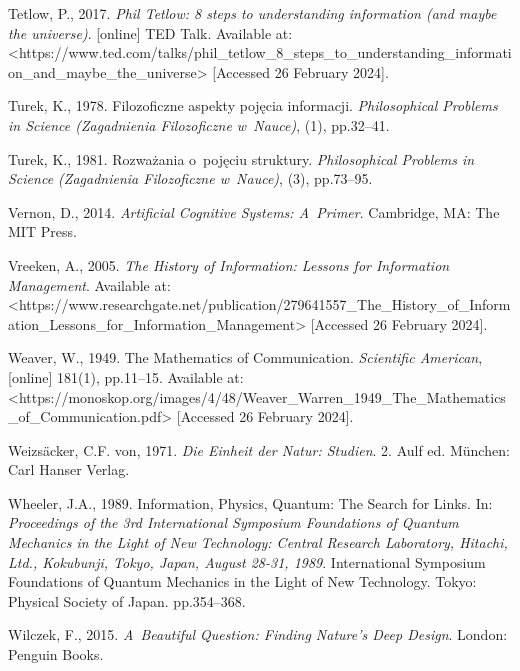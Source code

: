 Tetlow, P., 2017. \textit{Phil Tetlow: 8 steps to understanding information (and maybe the universe)}. [online] TED Talk. Available at: {\textless}https://www.ted.com/talks/phil\_tetlow\_8\_steps\_to\_understanding\_information\_and\_maybe\_the\_universe{\textgreater} [Accessed 26 February 2024].



Turek, K., 1978. Filozoficzne aspekty pojęcia informacji. \textit{Philosophical Problems in Science (Zagadnienia Filozoficzne w~Nauce)}, (1), pp.32–41.



Turek, K., 1981. Rozważania o~pojęciu struktury. \textit{Philosophical Problems in Science (Zagadnienia Filozoficzne w~Nauce)}, (3), pp.73–95.



Vernon, D., 2014. \textit{Artificial Cognitive Systems: A~Primer}. Cambridge, MA: The MIT Press.



Vreeken, A., 2005. \textit{The History of Information: Lessons for Information Management}. Available at: {\textless}https://www.researchgate.net/publication/279641557\_The\_History\_of\_Information\_Lessons\_for\_Information\_Management{\textgreater} [Accessed 26 February 2024].



Weaver, W., 1949. The Mathematics of Communication. \textit{Scientific American}, [online] 181(1), pp.11–15. Available at: {\textless}https://monoskop.org/images/4/48/Weaver\_Warren\_1949\_The\_Mathematics\_of\_Communication.pdf{\textgreater} [Accessed 26 February 2024].



Weizsäcker, C.F. von, 1971. \textit{Die Einheit der Natur: Studien}. 2. Aulf ed. München: Carl Hanser Verlag.



Wheeler, J.A., 1989. Information, Physics, Quantum: The Search for Links. In: \textit{Proceedings of the 3rd International Symposium Foundations of Quantum Mechanics in the Light of New Technology: Central Research Laboratory, Hitachi, Ltd., Kokubunji, Tokyo, Japan, August 28-31, 1989}. International Symposium Foundations of Quantum Mechanics in the Light of New Technology. Tokyo: Physical Society of Japan. pp.354–368.



Wilczek, F., 2015. \textit{A~Beautiful Question: Finding Nature's Deep Design}. London: Penguin Books.



